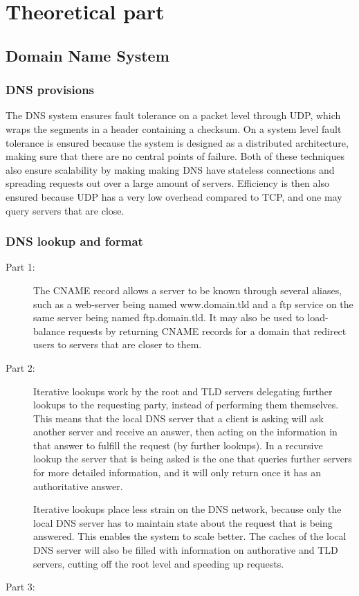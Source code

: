 \section{Theoretical part}

\subsection{Domain Name System}
\subsubsection{DNS provisions} %
The DNS system ensures fault tolerance on a packet level through UDP, which wraps the segments
in a header containing a checksum. On a system level fault tolerance is ensured because the system
is designed as a distributed architecture, making sure that there are no central points of failure.
Both of these techniques also ensure scalability by making making DNS have stateless connections and
spreading requests out over a large amount of servers. Efficiency is then also ensured because UDP has
a very low overhead compared to TCP, and one may query servers that are close.

\subsubsection{DNS lookup and format}
\begin{description}
    \item[Part 1:] The CNAME record allows a server to be known through several aliases, such as
        a web-server being named www.domain.tld and a ftp service on the same server being named
        ftp.domain.tld. It may also be used to load-balance requests by returning CNAME records
        for a domain that redirect users to servers that are closer to them.
    \item[Part 2:] Iterative lookups work by the root and TLD servers delegating further lookups
        to the requesting party, instead of performing them themselves. This means that the local
        DNS server that a client is asking will ask another server and receive an answer, then acting
        on the information in that answer to fulfill the request (by further lookups). In a recursive
        lookup the server that is being asked is the one that queries further servers for more detailed
        information, and it will only return once it has an authoritative answer.

        Iterative lookups place less strain on the DNS network, because only the local DNS server has
        to maintain state about the request that is being answered. This enables the system to scale
        better. The caches of the local DNS server will also be filled with information on authorative
        and TLD servers, cutting off the root level and speeding up requests.
    \item[Part 3:]  
\end{description}

